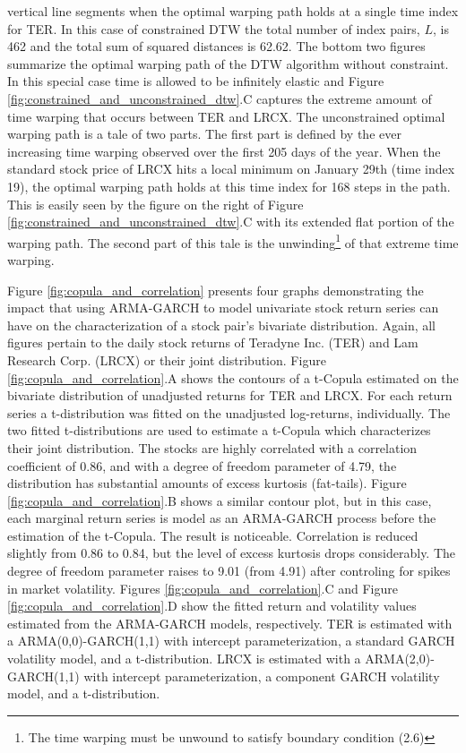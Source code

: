 vertical line segments when the optimal warping path holds at a single time index for TER. In this case of constrained DTW the total number of index pairs, $L$, is 462 and the total sum of squared distances is 62.62. The bottom two figures summarize the optimal warping path of the DTW algorithm without constraint. In this special case time is allowed to be infinitely elastic and Figure \ref{fig:constrained_and_unconstrained_dtw}.C captures the extreme amount of time warping that occurs between TER and LRCX. The unconstrained optimal warping path is a tale of two parts. The first part is defined by the ever increasing time warping observed over the first 205 days of the year. When the standard stock price of LRCX hits a local minimum on January 29th (time index 19), the optimal warping path holds at this time index for 168 steps in the path. This is easily seen by the figure on the right of Figure \ref{fig:constrained_and_unconstrained_dtw}.C with its extended flat portion of the warping path. The second part of this tale is the unwinding\footnote{The time warping must be unwound to satisfy boundary condition (2.6)} of that extreme time warping.

Figure \ref{fig:copula_and_correlation} presents four graphs demonstrating the impact that using ARMA-GARCH to model univariate stock return series can have on the characterization of a stock pair's bivariate distribution. Again, all figures pertain to the daily stock returns of Teradyne Inc. (TER) and Lam Research Corp. (LRCX) or their joint distribution. Figure \ref{fig:copula_and_correlation}.A shows the contours of a t-Copula estimated on the bivariate distribution of unadjusted returns for TER and LRCX. For each return series a t-distribution was fitted on the unadjusted log-returns, individually. The two fitted t-distributions are used to estimate a t-Copula which characterizes their joint distribution. The stocks are highly correlated with a correlation coefficient of 0.86, and with a degree of freedom parameter of 4.79, the distribution has substantial amounts of excess kurtosis (fat-tails). Figure \ref{fig:copula_and_correlation}.B shows a similar contour plot, but in this case, each marginal return series is model as an ARMA-GARCH process before the estimation of the t-Copula. The result is noticeable. Correlation is reduced slightly from 0.86 to 0.84, but the level of excess kurtosis drops considerably. The degree of freedom parameter raises to 9.01 (from 4.91) after controling for spikes in market volatility. Figures \ref{fig:copula_and_correlation}.C and Figure \ref{fig:copula_and_correlation}.D show the fitted return and volatility values estimated from the ARMA-GARCH models, respectively. TER is estimated with a ARMA(0,0)-GARCH(1,1) with intercept parameterization, a standard GARCH volatility model, and a t-distribution. LRCX is estimated with a ARMA(2,0)-GARCH(1,1) with intercept parameterization, a component GARCH volatility model, and a t-distribution.

